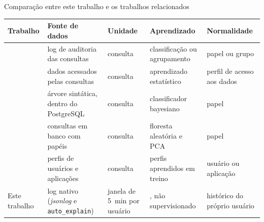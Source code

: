 \begin{quadro}[htb]
    \centering
    \ABNTEXfontereduzida
    \begin{minipage}{\textwidth}
        \caption{\label{qdr:trabalhos}Comparação entre este trabalho e os trabalhos relacionados}
        \begin{tabular}{|L{2.8cm}|L{3.2cm}|L{2.0cm}|L{3.0cm}|L{2.6cm}|}
            \hline
            \textbf{Trabalho} & \textbf{Fonte de dados} & \textbf{Unidade} & \textbf{Aprendizado} & \textbf{Normalidade} \\
            \hline
             & log de auditoria das consultas & consulta & classificação ou agrupamento & papel ou grupo \\
            \hline
             & dados acessados pelas consultas & consulta & aprendizado estatístico & perfil de acesso aos dados \\
            \hline
             & árvore sintática, dentro do PostgreSQL & consulta & classificador bayesiano & papel \\
            \hline
             & consultas em banco com papéis & consulta & floresta aleatória e PCA & papel \\
            \hline
             & perfis de usuários e aplicações & consulta & perfis aprendidos em treino & usuário ou aplicação \\
            \hline
            Este trabalho & log nativo (\textit{jsonlog} e \texttt{auto\_explain}) & janela de 5~min por usuário & \iforest{}, não supervisionado & histórico do próprio usuário \\
            \hline
        \end{tabular}
    \end{minipage}
\end{quadro}
